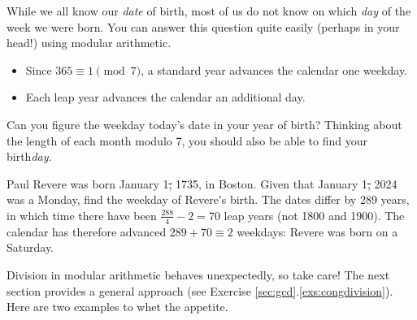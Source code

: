 While we all know our \emph{date} of birth, most of us do not know on which \emph{day} of the week we were born. You can answer this question quite easily (perhaps in your head!) using modular arithmetic.
\begin{itemize}
  \item Since $365\equiv 1\pmod 7$, a standard year advances the calendar one weekday.
  \item Each leap year\footnotemark{} advances the calendar an additional day.
\end{itemize}

Can you figure the weekday today's date in your year of birth? Thinking about the length of each month modulo 7, you should also be able to find your birth\emph{day.}

\begin{example}{}{}
	Paul Revere was born January 1\st, 1735, in Boston. Given that January 1\st, 2024 was a Monday, find the weekday of Revere's birth.\smallbreak
	The dates differ by 289 years, in which time there have been $\frac{288}4-2=70$ leap years (not 1800 and 1900). The calendar has therefore advanced $289+70\equiv 2$ weekdays: Revere was born on a Saturday.
\end{example}



Division in modular arithmetic behaves unexpectedly, so take care! The next section provides a general approach (see Exercise \ref*{sec:gcd}.\ref{exs:congdivision}). Here are two examples to whet the appetite.

